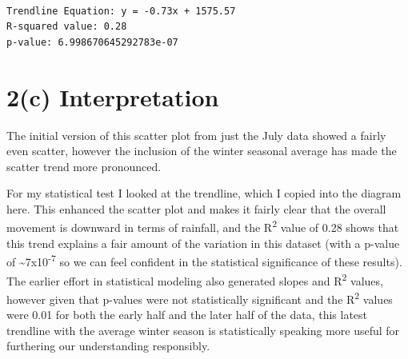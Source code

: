 \documentclass[
  letterpaper,
  DIV=11,
  numbers=noendperiod]{scrartcl}
\begin{document}
\begin{verbatim}

Trendline Equation: y = -0.73x + 1575.57
R-squared value: 0.28
p-value: 6.998670645292783e-07
\end{verbatim}

\section{2(c) Interpretation}\label{c-interpretation}

The initial version of this scatter plot from just the July data showed
a fairly even scatter, however the inclusion of the winter seasonal
average has made the scatter trend more pronounced.

For my statistical test I looked at the trendline, which I copied into
the diagram here. This enhanced the scatter plot and makes it fairly
clear that the overall movement is downward in terms of rainfall, and
the R\textsuperscript{2} value of 0.28 shows that this trend explains a
fair amount of the variation in this dataset (with a p-value of
\textasciitilde7x10\textsuperscript{-7} so we can feel confident in the
statistical significance of these results). The earlier effort in
statistical modeling also generated slopes and R\textsuperscript{2}
values, however given that p-values were not statistically significant
and the R\textsuperscript{2} values were 0.01 for both the early half
and the later half of the data, this latest trendline with the average
winter season is statistically speaking more useful for furthering our
understanding responsibly.
\end{document}
